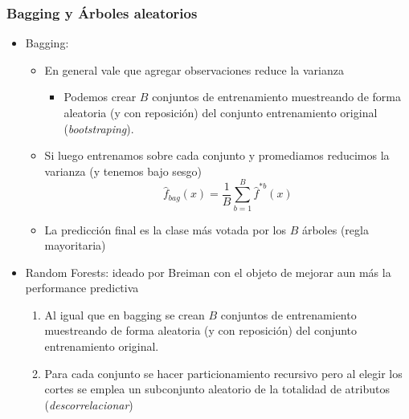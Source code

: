 \documentclass[leqno, 10pt, envcountsect]{beamer}
\numberwithin{equation}{section}
\theoremstyle{definition}
\theoremstyle{example}
\numberwithin{figure}{section}
\numberwithin{table}{section}
\let\olditem\item
\renewcommand{\item}{%
\olditem\vspace{1pt}}
\begin{document}
\begin{frame}
  \frametitle{Bagging y Árboles aleatorios}
  \begin{itemize}
    \item Bagging:
      \begin{itemize}
        \item En general vale que agregar observaciones reduce la varianza
          \begin{itemize}
            \item Podemos crear $B$ conjuntos de entrenamiento muestreando de forma
              aleatoria (y con reposición) del conjunto entrenamiento original
              (\textit{bootstraping}).
              \end{itemize}
            \item Si luego entrenamos sobre cada conjunto y promediamos
              reducimos la varianza (y tenemos bajo sesgo)
              \begin{equation*}
                \hat{f}_{bag}(x) = \frac{1}{B}\sum_{b=1}^{B}\hat{f}^{*b}(x)
              \end{equation*}
            \item La predicción final es la clase más votada por los $B$
              árboles (regla mayoritaria)
      \end{itemize}
    \item Random Forests: ideado por Breiman con el objeto de mejorar
      aun más la performance predictiva
      \begin{enumerate}
        \item Al igual que en bagging se crean $B$ conjuntos de entrenamiento muestreando de forma
          aleatoria (y con reposición) del conjunto entrenamiento original.
        \item Para cada conjunto se hacer particionamiento recursivo pero al
          elegir los cortes se emplea un subconjunto aleatorio de la totalidad
          de atributos (\textit{descorrelacionar})
      \end{enumerate}
  \end{itemize}
\end{frame}
\end{document}
